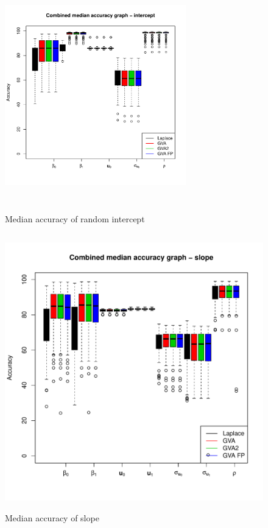\documentclass[times, doublespace]{anzsauth}
\begin{document}
	\begin{figure}
		\begin{center}
			\includegraphics[width=0.7\textwidth, height=100mm]{code/results/median_accuracy_combined_intercept.pdf}
			\caption{Median accuracy of random intercept}
			\label{fig:median_accuracy_intercept}
		\end{center}
	\end{figure}
	
	\begin{figure}
		\caption{Median accuracy of slope}
		\label{fig:median_accuracy_slope}
		\includegraphics[width=120mm, height=120mm]{code/results/median_accuracy_combined_slope.pdf}
	\end{figure}
	
\end{document}
